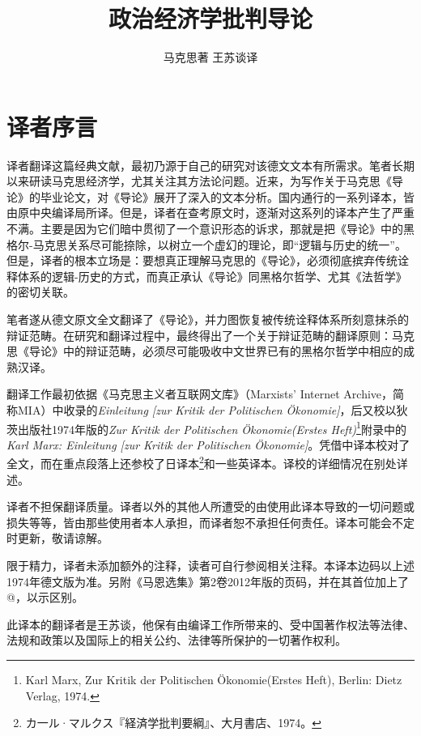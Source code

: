\documentclass[a4paper,twoside,12pt]{ctexart}
\title{政治经济学批判导论}
\author{马克思著 \quad 王苏谈译}
\begin{document}
\maketitle

\newpage

\tableofcontents

\newpage

\section{译者序言}

译者翻译这篇经典文献，最初乃源于自己的研究对该德文文本有所需求。笔者长期以来研读马克思经济学，尤其关注其方法论问题。近来，为写作关于马克思《导论》的毕业论文，对《导论》展开了深入的文本分析。国内通行的一系列译本，皆由原中央编译局所译。但是，译者在查考原文时，逐渐对这系列的译本产生了严重不满。主要是因为它们暗中贯彻了一个意识形态的诉求，那就是把《导论》中的黑格尔-马克思关系尽可能捺除，以树立一个虚幻的理论，即“逻辑与历史的统一”。但是，译者的根本立场是：要想真正理解马克思的《导论》，必须彻底摈弃传统诠释体系的逻辑-历史的方式，而真正承认《导论》同黑格尔哲学、尤其《法哲学》的密切关联。

笔者遂从德文原文全文翻译了《导论》，并力图恢复被传统诠释体系所刻意抹杀的辩证范畴。在研究和翻译过程中，最终得出了一个关于辩证范畴的翻译原则：马克思《导论》中的辩证范畴，必须尽可能吸收中文世界已有的黑格尔哲学中相应的成熟汉译。

翻译工作最初依据《马克思主义者互联网文库》（Marxists’ Internet Archive，简称MIA）中收录的\textit{Einleitung [zur Kritik der Politischen Ökonomie]}，后又校以狄茨出版社1974年版的\textit{Zur Kritik der Politischen Ökonomie(Erstes Heft)}\footnote{Karl Marx, Zur Kritik der Politischen Ökonomie(Erstes Heft), Berlin: Dietz Verlag, 1974. }附录中的\textit{Karl Marx: Einleitung [zur Kritik der Politischen Ökonomie]}。凭借中译本校对了全文，而在重点段落上还参校了日译本\footnote{\mincho カ一ル·マルクス『経済学批判要綱』、大月書店、1974。}和一些英译本。译校的详细情况在别处详述。

译者不担保翻译质量。译者以外的其他人所遭受的由使用此译本导致的一切问题或损失等等，皆由那些使用者本人承担，而译者恕不承担任何责任。译本可能会不定时更新，敬请谅解。

限于精力，译者未添加额外的注释，读者可自行参阅相关注释。本译本边码以上述1974年德文版为准。另附《马恩选集》第2卷2012年版的页码，并在其首位加上了@，以示区别。

此译本的翻译者是王苏谈，他保有由编译工作所带来的、受中国著作权法等法律、法规和政策以及国际上的相关公约、法律等所保护的一切著作权利。
\end{document}
